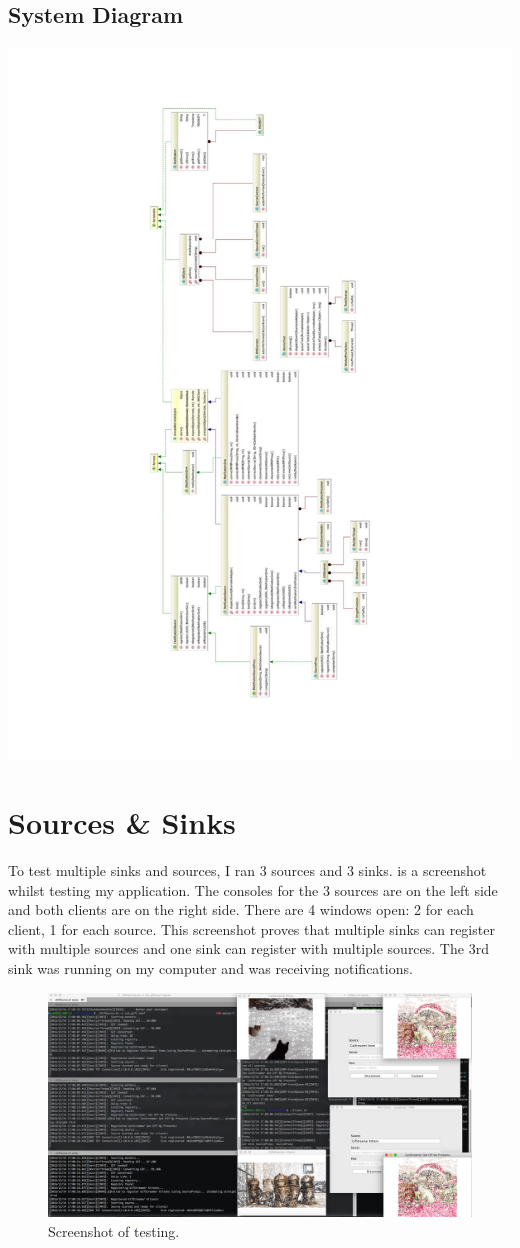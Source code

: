 \documentclass[a4paper]{article}
\begin{document}
\subsection{System Diagram}\label{sec:system_diagram}
\begin{center}
\includegraphics[width=0.9\textheight,height=\textwidth,keepaspectratio,angle=90]{SystemDiagram}
\end{center}

\section{Sources \& Sinks}
To test multiple sinks and sources, I ran 3 sources and 3 sinks.
 is a screenshot whilst testing my application.
The consoles for the 3 sources are on the left side and both clients are on the right side.
There are 4 windows open: 2 for each client, 1 for each source.
This screenshot proves that multiple sinks can register with multiple sources and one sink can register with multiple sources.
The 3rd sink was running on my computer and was receiving notifications.

\begin{figure}[h]
\includegraphics[width=\textwidth]{testing}
\caption{Screenshot of testing.\label{fig:testing}}
\end{figure}
\end{document}
